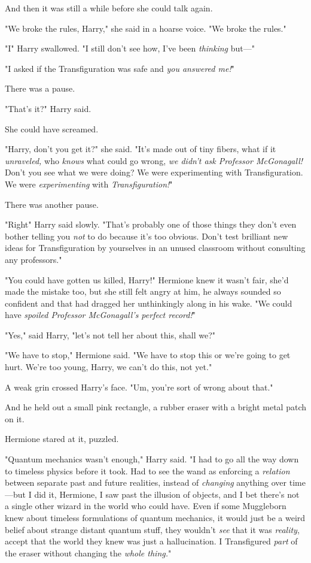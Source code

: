And then it was still a while before she could talk again.

"We broke the rules, Harry," she said in a hoarse voice. "We broke the rules."

"I{\el}" Harry swallowed. "I still don't see how, I've been \emph{thinking}
but\mbox{---}"

"I asked if the Transfiguration was safe and \emph{you answered me!}"

There was a pause.

"That's it?" Harry said.

She could have screamed.

"Harry, don't you get it?" she said. "It's made out of tiny fibers, what if it
\emph{unraveled,} who \emph{knows} what could go wrong, \emph{we didn't ask
Professor McGonagall!} Don't you see what we were doing? We were experimenting
with Transfiguration. We were \emph{experimenting} with \emph{Transfiguration!}"

There was another pause.

"Right{\el}" Harry said slowly. "That's probably one of those things they
don't even bother telling you \emph{not} to do because it's too obvious. Don't
test brilliant new ideas for Transfiguration by yourselves in an unused
classroom without consulting any professors."

"You could have gotten us killed, Harry!" Hermione knew it wasn't fair, she'd
made the mistake too, but she still felt angry at him, he always sounded so
confident and that had dragged her unthinkingly along in his wake. "We could
have \emph{spoiled Professor McGonagall's perfect record!}"

"Yes," said Harry, "let's not tell her about this, shall we?"

"We have to stop," Hermione said. "We have to stop this or we're going to get
hurt. We're too young, Harry, we can't do this, not yet."

A weak grin crossed Harry's face. "Um, you're sort of wrong about that."

And he held out a small pink rectangle, a rubber eraser with a bright metal
patch on it.

Hermione stared at it, puzzled.

"Quantum mechanics wasn't enough," Harry said. "I had to go all the way down to
timeless physics before it took. Had to see the wand as enforcing a
\emph{relation} between separate past and future realities, instead of
\emph{changing} anything over time---but I did it, Hermione, I saw past the
illusion of objects, and I bet there's not a single other wizard in the world
who could have. Even if some Muggleborn knew about timeless formulations of
quantum mechanics, it would just be a weird belief about strange distant
quantum stuff, they wouldn't \emph{see} that it was \emph{reality}, accept that
the world they knew was just a hallucination. I Transfigured \emph{part} of the
eraser without changing the \emph{whole thing.}"

